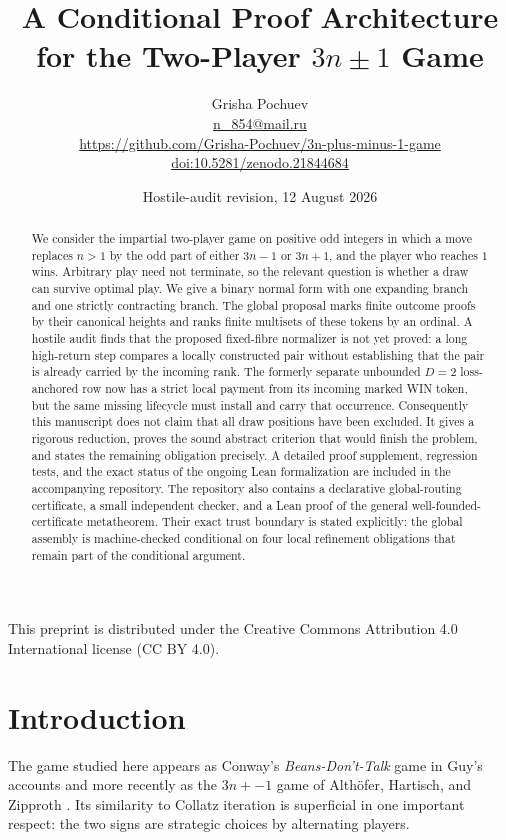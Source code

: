 \documentclass[11pt]{article}
\title{A Conditional Proof Architecture for the Two-Player $3n\mathbin{\pm}1$ Game}
\author{Grisha Pochuev\\
  \small\href{mailto:n_854@mail.ru}{n\_854@mail.ru}\\
  \small\url{https://github.com/Grisha-Pochuev/3n-plus-minus-1-game}\\
  \small\href{https://doi.org/10.5281/zenodo.21844684}%
  {doi:10.5281/zenodo.21844684}}
\date{Hostile-audit revision, 12 August 2026}
\begin{document}
\maketitle

\begin{center}
\small This preprint is distributed under the Creative Commons Attribution
4.0 International license (CC BY 4.0).
\end{center}

\begin{abstract}
We consider the impartial two-player game on positive odd integers in which a
move replaces $n>1$ by the odd part of either $3n-1$ or $3n+1$, and the player
who reaches $1$ wins. Arbitrary play need not terminate, so the relevant
question is whether a draw can survive optimal play. We give a binary normal
form with one expanding branch and one strictly contracting branch. The global
proposal marks finite outcome proofs by their canonical heights and ranks
finite multisets of these tokens by an ordinal. A hostile audit finds that the
proposed fixed-fibre normalizer is not yet proved: a long high-return step
compares a locally constructed pair without establishing that the pair is
already carried by the incoming rank. The formerly separate unbounded $D=2$
loss-anchored row now has a strict local payment from its incoming marked WIN
token, but the same missing lifecycle must install and carry that occurrence.
Consequently this manuscript does not claim that all draw positions have been
excluded. It gives a rigorous reduction, proves the sound abstract criterion
that would finish the problem, and states the remaining obligation precisely. A detailed proof supplement,
regression tests, and the exact status of the ongoing Lean formalization are
included in the accompanying repository. The repository also contains a
declarative global-routing certificate, a small independent checker, and a
Lean proof of the general well-founded-certificate metatheorem. Their exact
trust boundary is stated explicitly: the global assembly is machine-checked
conditional on four local refinement obligations that remain part of the
conditional argument.
\end{abstract}

\section{Introduction}

The game studied here appears as Conway's \emph{Beans-Don't-Talk} game in
Guy's accounts \cite{Guy1986,Guy1996} and more recently as the $3n{+}{-}1$
game of Alth\"ofer, Hartisch, and Zipproth
\cite{AlthoferHartischZipproth2024}. Its similarity to Collatz iteration is
superficial in one important respect: the two signs are strategic choices by
alternating players.
\end{document}
